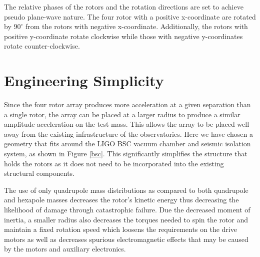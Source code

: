 \documentclass[superscriptaddress, twocolumn, prd]{revtex4-1}
\begin{document}
The relative phases of the rotors and the rotation directions are set to achieve pseudo plane-wave nature. The four rotor with a positive x-coordinate are rotated by $90^\circ$ from the rotors with negative x-coordinate. Additionally, the rotors with positive y-coordinate rotate clockwise while those with negative y-coordinates rotate counter-clockwise. 

\section{Engineering Simplicity}

Since the four rotor array produces more acceleration at a given separation than a single rotor, the array can be placed at a larger radius to produce a similar amplitude acceleration on the test mass. This allows the array to be placed well away from the existing infrastructure of the observatories. Here we have chosen a geometry that fits around the LIGO BSC vacuum chamber and seismic isolation system, as shown in Figure \ref{bsc}. This significantly simplifies the structure that holds the rotors as it does not need to be incorporated into the existing structural components. 

The use of only quadrupole mass distributions as compared to both quadrupole and hexapole masses \cite{ncal} decreases the rotor's kinetic energy thus decreasing the likelihood of damage through catastrophic failure. Due the decreased moment of inertia, a smaller radius also decreases the torques needed to spin the rotor and maintain a fixed rotation speed which loosens the requirements on the drive motors as well as decreases spurious electromagnetic effects that may be caused by the motors and auxiliary electronics. 



\end{document}
